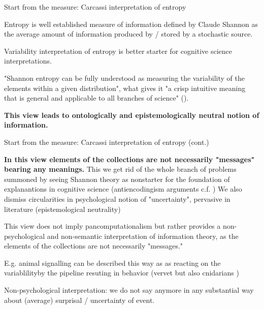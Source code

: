 \documentclass[10pt, aspectratio=169, handout]{beamer}
\begin{document}
\begin{frame}[label=carcassi_entropy] { Start from the measure: Carcassi interpretation of entropy}

   Entropy is well established measure of information defined by Claude Shannon 
    \cite{shannon1949mathematical} as the average amount of information  produced by / stored by a stochastic source. 

    Variability interpretation of entropy \cite{carcassi_variability_2021}  is better starter for cognitive science interpretations. 


"Shannon entropy can be fully understood as measuring the variability of the elements within a given distribution", what gives it "a crisp intuitive meaning that is general and applicable to all branches of science" (\cite{carcassi_variability_2021}).

\textbf{This view leads to ontologically and epistemologically neutral notion of information.
}

\end{frame}

\begin{frame}[label=carcassi_entropy2] { Start from the measure: Carcassi interpretation of entropy (cont.)} 

\textbf{In this view elements of the collections are not necessarily "messages" bearing any meanings.} This we get rid of  the whole branch of problems summoned by seeing Shannon theory as nonstarter for the foundation of explanantions in cognitive science  (antiencodingism arguments c.f. \cite{bickhard_interactivist_2009} ) We also dismiss circularities in psychological notion of "uncertainty", pervasive in literature (epistemological neutrality)

This view does not imply pancomputationalism but rather provides a non-psychological and non-semantic interpretation of information theory, as the elements of the collections are not necessarily "messages."

E.g. animal signalling can be described this way as as reacting on the variablilityby the pipeline resuting in behavior (vervet but also cnidarians )


Non-psychological interpretation: we do not say anymore in any substantial way about (average) surprisal / uncertainty of event.
 

\end{frame}
\end{document}

